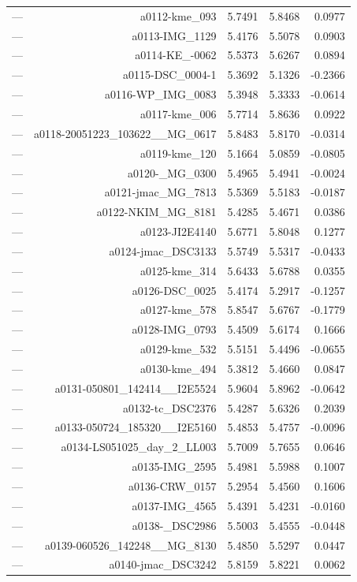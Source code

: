 \begin{table}[htbp]
\begin{tabular}{lrrrr}
— & a0112-kme_093 & 5.7491 & 5.8468 & 0.0977 \\
— & a0113-IMG_1129 & 5.4176 & 5.5078 & 0.0903 \\
— & a0114-KE_-0062 & 5.5373 & 5.6267 & 0.0894 \\
— & a0115-DSC_0004-1 & 5.3692 & 5.1326 & -0.2366 \\
— & a0116-WP_IMG_0083 & 5.3948 & 5.3333 & -0.0614 \\
— & a0117-kme_006 & 5.7714 & 5.8636 & 0.0922 \\
— & a0118-20051223_103622__MG_0617 & 5.8483 & 5.8170 & -0.0314 \\
— & a0119-kme_120 & 5.1664 & 5.0859 & -0.0805 \\
— & a0120-_MG_0300 & 5.4965 & 5.4941 & -0.0024 \\
— & a0121-jmac_MG_7813 & 5.5369 & 5.5183 & -0.0187 \\
— & a0122-NKIM_MG_8181 & 5.4285 & 5.4671 & 0.0386 \\
— & a0123-JI2E4140 & 5.6771 & 5.8048 & 0.1277 \\
— & a0124-jmac_DSC3133 & 5.5749 & 5.5317 & -0.0433 \\
— & a0125-kme_314 & 5.6433 & 5.6788 & 0.0355 \\
— & a0126-DSC_0025 & 5.4174 & 5.2917 & -0.1257 \\
— & a0127-kme_578 & 5.8547 & 5.6767 & -0.1779 \\
— & a0128-IMG_0793 & 5.4509 & 5.6174 & 0.1666 \\
— & a0129-kme_532 & 5.5151 & 5.4496 & -0.0655 \\
— & a0130-kme_494 & 5.3812 & 5.4660 & 0.0847 \\
— & a0131-050801_142414__I2E5524 & 5.9604 & 5.8962 & -0.0642 \\
— & a0132-tc_DSC2376 & 5.4287 & 5.6326 & 0.2039 \\
— & a0133-050724_185320__I2E5160 & 5.4853 & 5.4757 & -0.0096 \\
— & a0134-LS051025_day_2_LL003 & 5.7009 & 5.7655 & 0.0646 \\
— & a0135-IMG_2595 & 5.4981 & 5.5988 & 0.1007 \\
— & a0136-CRW_0157 & 5.2954 & 5.4560 & 0.1606 \\
— & a0137-IMG_4565 & 5.4391 & 5.4231 & -0.0160 \\
— & a0138-_DSC2986 & 5.5003 & 5.4555 & -0.0448 \\
— & a0139-060526_142248__MG_8130 & 5.4850 & 5.5297 & 0.0447 \\
— & a0140-jmac_DSC3242 & 5.8159 & 5.8221 & 0.0062 \\

\end{tabular}
\end{table}
